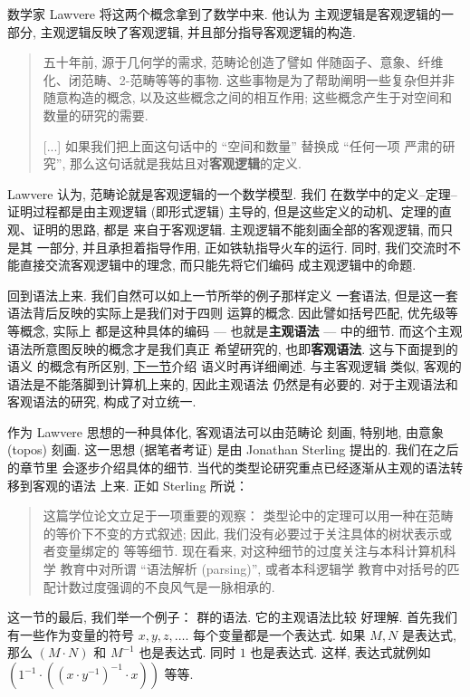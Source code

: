 数学家 Lawvere 将这两个概念拿到了数学中来. 他认为
主观逻辑是客观逻辑的一部分, 主观逻辑反映了客观逻辑,
并且部分指导客观逻辑的构造.
\begin{quotation}
五十年前, 源于几何学的需求, 范畴论创造了譬如
伴随函子、意象、纤维化、闭范畴、2-范畴等等的事物.
这些事物是为了帮助阐明一些复杂但并非随意构造的概念,
以及这些概念之间的相互作用; 这些概念产生于对空间和
数量的研究的需要.

[...] 如果我们把上面这句话中的 “空间和数量” 替换成 “任何一项
严肃的研究”, 那么这句话就是我姑且对\textbf{客观逻辑}的定义.%
~\cite{lawvere:1994:objective}
\end{quotation}
Lawvere 认为, 范畴论就是客观逻辑的一个数学模型. 我们
在数学中的定义--定理--证明过程都是由主观逻辑 (即形式逻辑)
主导的, 但是这些定义的动机、定理的直观、证明的思路, 都是
来自于客观逻辑. 主观逻辑不能刻画全部的客观逻辑, 而只是其
一部分, 并且承担着指导作用, 正如铁轨指导火车的运行. 同时,
我们交流时不能直接交流客观逻辑中的理念, 而只能先将它们编码
成主观逻辑中的命题.

回到语法上来. 我们自然可以如上一节所举的例子那样定义
一套语法, 但是这一套语法背后反映的实际上是我们对于四则
运算的概念. 因此譬如括号匹配, 优先级等等概念, 实际上
都是这种具体的编码 --- 也就是\textbf{主观语法} ---
中的细节. 而这个主观语法所意图反映的概念才是我们真正
希望研究的, 也即\textbf{客观语法}. 这与下面提到的语义
的概念有所区别, \hyperref[intro:semantics]{下一节}介绍
语义时再详细阐述. 与主客观逻辑
类似, 客观的语法是不能落脚到计算机上来的, 因此主观语法
仍然是有必要的. 对于主观语法和客观语法的研究, 构成了对立统一.

作为 Lawvere 思想的一种具体化, 客观语法可以由范畴论
刻画, 特别地, 由意象 (topos) 刻画. 这一思想 (据笔者考证)
是由 Jonathan Sterling 提出的. 我们在之后的章节里
会逐步介绍具体的细节.
当代的类型论研究重点已经逐渐从主观的语法转移到客观的语法
上来. 正如 Sterling 所说：

\begin{quotation}
这篇学位论文立足于一项重要的观察：
类型论中的定理可以用一种在范畴的等价下不变的方式叙述;
因此, 我们没有必要过于关注具体的树状表示或者变量绑定的
等等细节. 现在看来, 对这种细节的过度关注与本科计算机科学
教育中对所谓 “语法解析 (parsing)”, 或者本科逻辑学
教育中对括号的匹配计数过度强调的不良风气是一脉相承的.
~\cite[(4.2)]{sterling:2021:thesis}
\end{quotation}

这一节的最后, 我们举一个例子： 群的语法. 它的主观语法比较
好理解. 首先我们有一些作为变量的符号 \(x,y,z,\dots\).
每个变量都是一个表达式. 如果 \(M, N\) 是表达式, 那么
\((M \cdot N)\) 和 \(M^{-1}\) 也是表达式. 同时
\(1\) 也是表达式. 这样, 表达式就例如
\((1^{-1} \cdot ((x \cdot y^{-1})^{-1} \cdot x))\) 等等.

